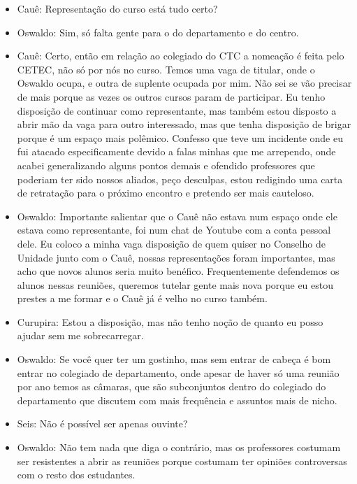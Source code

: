 \documentclass{ata-calico}
\begin{document}
\begin{itemize}
\item Cauê: Representação do curso está tudo certo?

\item Oswaldo: Sim, só falta gente para o do departamento e do centro.

\item Cauê: Certo, então em relação ao colegiado do CTC a nomeação é feita pelo CETEC, não só por nós no curso. Temos uma vaga de titular, onde o Oswaldo ocupa, e outra de suplente ocupada por mim. Não sei se vão precisar de mais porque as vezes os outros cursos param de participar. Eu tenho disposição de continuar como representante, mas também estou disposto a abrir mão da vaga para outro interessado, mas que tenha disposição de brigar porque é um espaço mais polêmico. Confesso que teve um incidente onde eu fui atacado especificamente devido a falas minhas que me arrependo, onde acabei generalizando alguns pontos demais e ofendido professores que poderiam ter sido nossos aliados, peço desculpas, estou redigindo uma carta de retratação para o próximo encontro e pretendo ser mais cauteloso.

\item Oswaldo: Importante salientar que o Cauê não estava num espaço onde ele estava como representante, foi num chat de Youtube com a conta pessoal dele. Eu coloco a minha vaga disposição de quem quiser no Conselho de Unidade junto com o Cauê, nossas representações foram importantes, mas acho que novos alunos seria muito benéfico. Frequentemente defendemos os alunos nessas reuniões, queremos tutelar gente mais nova porque eu estou prestes a me formar e o Cauê já é velho no curso também.

\item Curupira: Estou a disposição, mas não tenho noção de quanto eu posso ajudar sem me sobrecarregar.

\item Oswaldo: Se você quer ter um gostinho, mas sem entrar de cabeça é bom entrar no colegiado de departamento, onde apesar de haver só uma reunião por ano temos as câmaras, que são subconjuntos dentro do colegiado do departamento que discutem com mais frequência e assuntos mais de nicho.

\item Seis: Não é possível ser apenas ouvinte?

\item Oswaldo: Não tem nada que diga o contrário, mas os professores costumam ser resistentes a abrir as reuniões porque costumam ter opiniões controversas com o resto dos estudantes.


\end{itemize}
\end{document}
